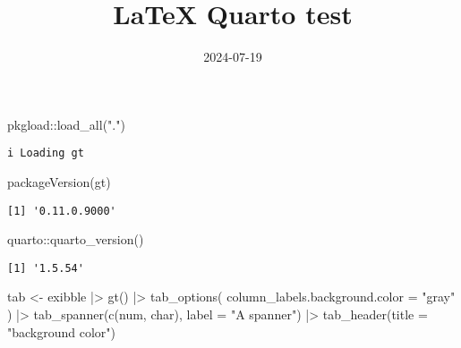 \documentclass[
  letterpaper,
  DIV=11,
  numbers=noendperiod]{scrartcl}
\title{LaTeX Quarto test}
\author{}
\date{2024-07-19}
\newenvironment{Shaded}{\begin{snugshade}}{\end{snugshade}}
\newcommand{\AttributeTok}[1]{\textcolor[rgb]{0.40,0.45,0.13}{#1}}
\newcommand{\FunctionTok}[1]{\textcolor[rgb]{0.28,0.35,0.67}{#1}}
\newcommand{\NormalTok}[1]{\textcolor[rgb]{0.00,0.23,0.31}{#1}}
\newcommand{\OtherTok}[1]{\textcolor[rgb]{0.00,0.23,0.31}{#1}}
\newcommand{\SpecialCharTok}[1]{\textcolor[rgb]{0.37,0.37,0.37}{#1}}
\newcommand{\StringTok}[1]{\textcolor[rgb]{0.13,0.47,0.30}{#1}}
\begin{document}
\maketitle

\listoftables

\begin{Shaded}
\begin{Highlighting}[]
\NormalTok{pkgload}\SpecialCharTok{::}\FunctionTok{load\_all}\NormalTok{(}\StringTok{"."}\NormalTok{)}
\end{Highlighting}
\end{Shaded}

\begin{verbatim}
i Loading gt
\end{verbatim}

\begin{Shaded}
\begin{Highlighting}[]
\FunctionTok{packageVersion}\NormalTok{(}\StringTok{\textquotesingle{}gt\textquotesingle{}}\NormalTok{)}
\end{Highlighting}
\end{Shaded}

\begin{verbatim}
[1] '0.11.0.9000'
\end{verbatim}

\begin{Shaded}
\begin{Highlighting}[]
\NormalTok{quarto}\SpecialCharTok{::}\FunctionTok{quarto\_version}\NormalTok{()}
\end{Highlighting}
\end{Shaded}

\begin{verbatim}
[1] '1.5.54'
\end{verbatim}

\newpage{}

\begin{Shaded}
\begin{Highlighting}[]
\NormalTok{tab }\OtherTok{\textless{}{-}}\NormalTok{ exibble }\SpecialCharTok{|\textgreater{}}
  \FunctionTok{gt}\NormalTok{() }\SpecialCharTok{|\textgreater{}}
  \FunctionTok{tab\_options}\NormalTok{(}
    \AttributeTok{column\_labels.background.color =} \StringTok{"gray"}
\NormalTok{  ) }\SpecialCharTok{|\textgreater{}}
  \FunctionTok{tab\_spanner}\NormalTok{(}\FunctionTok{c}\NormalTok{(num, char), }\AttributeTok{label =} \StringTok{"A spanner"}\NormalTok{) }\SpecialCharTok{|\textgreater{}}
  \FunctionTok{tab\_header}\NormalTok{(}\AttributeTok{title =} \StringTok{"background color"}\NormalTok{)}
\end{Highlighting}
\end{Shaded}
\end{document}
